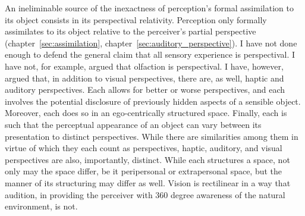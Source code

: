 An ineliminable source of the inexactness of perception's formal assimilation to its object consists in its perspectival relativity. Perception only formally assimilates to its object relative to the perceiver's partial perspective (chapter~\ref{sec:assimilation}, chapter~\ref{sec:auditory_perspective}). I have not done enough to defend the general claim that all sensory experience is perspectival. I have not, for example, argued that olfaction is perspectival. I have, however, argued that, in addition to visual perspectives, there are, as well, haptic and auditory perspectives. Each allows for better or worse perspectives, and each involves the potential disclosure of previously hidden aspects of a sensible object. Moreover, each does so in an ego-centrically structured space. Finally, each is such that the perceptual appearance of an object can vary between its presentation to distinct perspectives. While there are similarities among them in virtue of which they each count as perspectives, haptic, auditory, and visual perspectives are also, importantly, distinct. While each structures a space, not only may the space differ, be it peripersonal or extrapersonal space, but the manner of its structuring may differ as well. Vision is rectilinear in a way that audition, in providing the perceiver with 360 degree awareness of the natural environment, is not.

